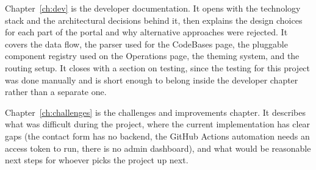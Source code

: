 Chapter~\ref{ch:dev} is the developer documentation. It opens with the technology stack and the architectural decisions behind it, then explains the design choices for each part of the portal and why alternative approaches were rejected. It covers the data flow, the parser used for the CodeBases page, the pluggable component registry used on the Operations page, the theming system, and the routing setup. It closes with a section on testing, since the testing for this project was done manually and is short enough to belong inside the developer chapter rather than a separate one.

Chapter~\ref{ch:challenges} is the challenges and improvements chapter. It describes what was difficult during the project, where the current implementation has clear gaps (the contact form has no backend, the GitHub Actions automation needs an access token to run, there is no admin dashboard), and what would be reasonable next steps for whoever picks the project up next.
